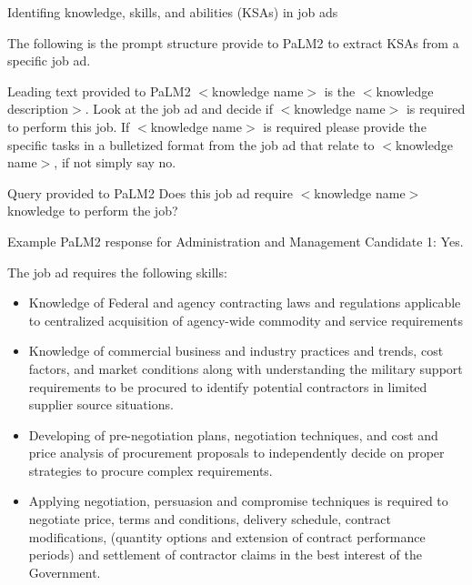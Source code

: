 \documentclass{beamer}
\begin{document}
\begin{frame}{Identifing knowledge, skills, and abilities (KSAs) in job ads}

  The following is the prompt structure provide to PaLM2 to extract KSAs from a specific job ad.

  \begin{exampleblock}{Leading text provided to PaLM2}
    $<$knowledge name$>$ is the $<$knowledge description$>$. Look at the job ad and decide if $<$knowledge name$>$ is required to perform this job. If $<$knowledge name$>$ is required please provide the specific tasks in a bulletized format from the job ad that relate to $<$knowledge name$>$, if not simply say no.
  \end{exampleblock}
  \begin{exampleblock}{Query provided to PaLM2}
    Does this job ad require $<$knowledge name$>$ knowledge to perform the job?
  \end{exampleblock}
  
\end{frame}

\begin{frame}{Example PaLM2 response for Administration and Management}
  \scriptsize
  Candidate 1: Yes.

  The job ad requires the following skills:

  \begin{itemize}
    \item Knowledge of Federal and agency contracting laws and regulations applicable to centralized acquisition of agency-wide commodity and service requirements
    \item Knowledge of commercial business and industry practices and trends, cost factors, and market conditions along with understanding the military support requirements to be procured to identify potential contractors in limited supplier source situations.
    \item Developing of pre-negotiation plans, negotiation techniques, and cost and price analysis of procurement proposals to independently decide on proper strategies to procure complex requirements.
    \item Applying negotiation, persuasion and compromise techniques is required to negotiate price, terms and conditions, delivery schedule, contract modifications, (quantity options and extension of contract performance periods) and settlement of contractor claims in the best interest of the Government.
  \end{itemize}
  
\end{frame}
\end{document}
